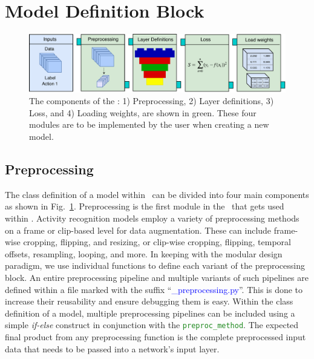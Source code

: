 \documentclass{llncs}
\begin{document}
\section{Model Definition Block}
\label{sec:modeldefblock}

\begin{figure}[b!]
\centering
\includegraphics[width=\columnwidth]{images/model_submodule.pdf}
\caption{The components of the \modeldef: 1) Preprocessing, 2) Layer definitions, 3) Loss, and 4) Loading weights, are shown in green.
These four modules are to be implemented by the user when creating a new model. }
\label{fig:model_submodule}
\end{figure}


\subsection{Preprocessing}
The class definition of a model within \acro~can be divided into four main components as shown in Fig.~\ref{fig:model_submodule}.
Preprocessing is the first module in the \model~that gets used within \data.
Activity recognition models employ a variety of preprocessing methods on a frame or clip-based level for data augmentation.
These can include frame-wise cropping, flipping, and resizing, or clip-wise cropping, flipping, temporal offsets, resampling, looping, and more.
In keeping with the modular design paradigm, we use individual functions to define each variant of the preprocessing block.
An entire preprocessing pipeline and multiple variants of such pipelines are defined within a file marked with the suffix ``\textcolor{blue}{\_preprocessing.py}''. 
This is done to increase their reusability and ensure debugging them is easy.
Within the class definition of a model, multiple preprocessing pipelines can be included using a simple \textit{if-else} construct in conjunction with the \texttt{\textcolor{ForestGreen}{preproc\_method}}.
The expected final product from any preprocessing function is the complete preprocessed input data that needs to be passed into a network's input layer.
\end{document}
